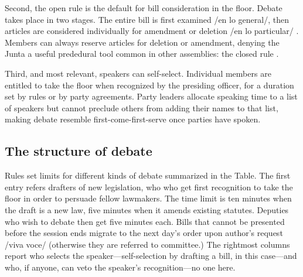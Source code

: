 \documentclass[letter,12pt]{article}
\begin{document}
Second, the open rule is the default for bill consideration in the floor. Debate takes place in two stages. The entire bill is first examined /en lo general/, then articles are considered individually for amendment or deletion /en lo particular/ \citep[see][]{heller.weldon.nd}. Members can always reserve articles for deletion or amendment, denying the Junta a useful prededural tool common in other assemblies: the closed rule \citep[eg.,][]{cox.2006,weingast.1992,magar-palanza-sin-Pdt-fast-track-chile-2021jop}.

Third, and most relevant, speakers can self-select. Individual members are entitled to take the floor when recognized by the presiding officer, for a duration set by rules or by party agreements. Party leaders allocate speaking time to a list of speakers but cannot preclude others from adding their names to that list, making debate resemble first-come-first-serve once parties have spoken. 


  \subsection{The structure of debate}
Rules set limits for different kinds of debate summarized in the Table. The first entry refers drafters of new legislation, who who get first recognition to take the floor in order to persuade fellow lawmakers. The time limit is ten minutes when the draft is a new law, five minutes when it amends existing statutes. Deputies who wish to debate then get five minutes each. Bills that cannot be presented before the session ends migrate to the next day's order upon author's request /viva voce/ (otherwise they are referred to committee.) The rightmost columns report who selects the speaker---self-selection by drafting a bill, in this case---and who, if anyone, can veto the speaker's recognition---no one here. 
\end{document}
